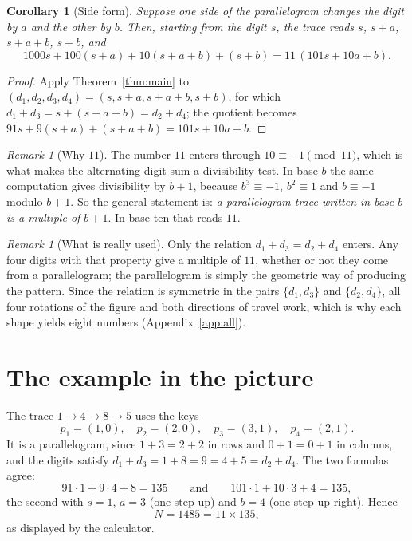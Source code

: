 \documentclass[11pt,a4paper]{article}
\newtheorem{corollary}[theorem]{Corollary}
\theoremstyle{definition}
\theoremstyle{remark}
\newtheorem{remark}[theorem]{Remark}
\begin{document}
\begin{corollary}[Side form]
\label{cor:sides}
Suppose one side of the parallelogram changes the digit by $a$ and the other by $b$.
Then, starting from the digit $s$, the trace reads $s$, $s+a$, $s+a+b$, $s+b$, and
\[
1000s+100(s+a)+10(s+a+b)+(s+b)=11\,(101s+10a+b).
\]
\end{corollary}

\begin{proof}
Apply Theorem~\ref{thm:main} to $(d_1,d_2,d_3,d_4)=(s,s+a,s+a+b,s+b)$, for which
$d_1+d_3=s+(s+a+b)=d_2+d_4$; the quotient becomes
$91s+9(s+a)+(s+a+b)=101s+10a+b$.
\end{proof}

\begin{remark}[Why $11$]
The number $11$ enters through $10\equiv-1\pmod{11}$, which is what makes the
alternating digit sum a divisibility test. In base $b$ the same computation gives
divisibility by $b+1$, because $b^3\equiv-1$, $b^2\equiv 1$ and $b\equiv-1$ modulo
$b+1$. So the general statement is: \emph{a parallelogram trace written in base $b$
is a multiple of $b+1$}. In base ten that reads $11$.
\end{remark}

\begin{remark}[What is really used]
Only the relation $d_1+d_3=d_2+d_4$ enters. Any four digits with that property give
a multiple of $11$, whether or not they come from a parallelogram; the parallelogram
is simply the geometric way of producing the pattern. Since the relation is
symmetric in the pairs $\{d_1,d_3\}$ and $\{d_2,d_4\}$, all four rotations of the
figure and both directions of travel work, which is why each shape yields eight
numbers (Appendix~\ref{app:all}).
\end{remark}

\section{The example in the picture}

The trace $1\to4\to8\to5$ uses the keys
\[
p_1=(1,0),\quad p_2=(2,0),\quad p_3=(3,1),\quad p_4=(2,1).
\]
It is a parallelogram, since $1+3=2+2$ in rows and $0+1=0+1$ in columns, and the
digits satisfy $d_1+d_3=1+8=9=4+5=d_2+d_4$. The two formulas agree:
\[
91\cdot 1+9\cdot 4+8=135
\qquad\text{and}\qquad
101\cdot 1+10\cdot 3+4=135,
\]
the second with $s=1$, $a=3$ (one step up) and $b=4$ (one step up-right). Hence
\[
N=1485=11\times 135,
\]
as displayed by the calculator.
\end{document}
